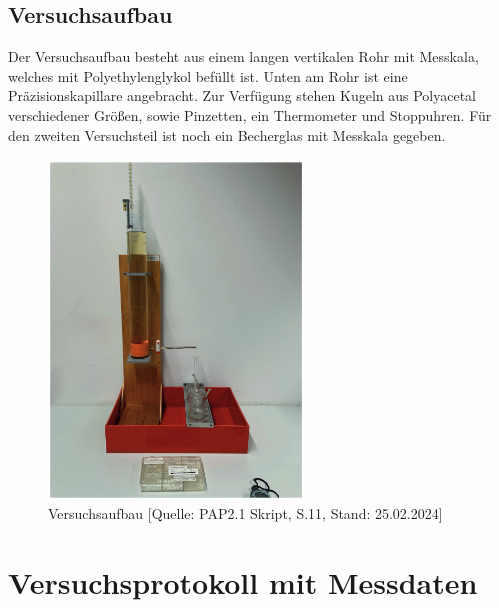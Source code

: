 \documentclass{article}
\begin{document}
\subsection{Versuchsaufbau}

Der Versuchsaufbau besteht aus einem langen vertikalen Rohr mit Messkala, welches mit Polyethylenglykol befüllt ist. Unten am Rohr ist eine Präzisionskapillare angebracht. Zur Verfügung stehen Kugeln aus Polyacetal verschiedener Größen, sowie Pinzetten, ein Thermometer und Stoppuhren. Für den zweiten Versuchsteil ist noch ein Becherglas mit Messkala gegeben. 

\phantom{.}

\begin{figure} [!h]
    \centering
    \includegraphics[height=9cm]{graphics/aufbau.png}
    \caption{Versuchsaufbau [Quelle: PAP2.1 Skript, S.11, Stand: 25.02.2024]}
\end{figure}

\newpage

\section{Versuchsprotokoll mit Messdaten}
\end{document}
